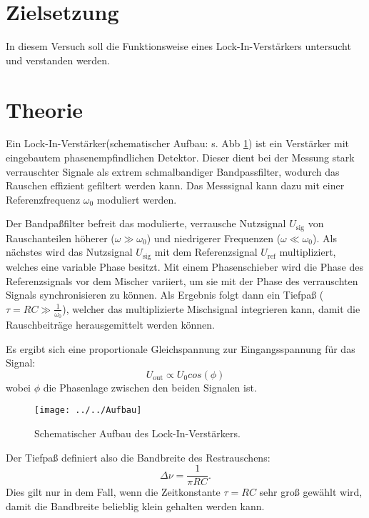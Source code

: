 \section{Zielsetzung}
\label{sec:Zielsetzung}
In diesem Versuch soll die Funktionsweise eines Lock-In-Verstärkers untersucht und verstanden werden.

\section{Theorie}
\label{sec:Theorie}
Ein Lock-In-Verstärker(schematischer Aufbau: s. Abb \ref{fig:aufbau}) ist ein Verstärker mit eingebautem phasenempfindlichen Detektor. Dieser dient bei der Messung stark verrauschter Signale als extrem schmalbandiger Bandpassfilter, wodurch das Rauschen effizient gefiltert werden kann. Das Messsignal kann dazu mit einer Referenzfrequenz $\omega_{0}$ moduliert werden.

Der Bandpaßfilter befreit das modulierte, verrausche Nutzsignal $U_{\text{sig}}$ von Rauschanteilen höherer ($\omega \gg \omega_{0} $) und niedrigerer Frequenzen ($\omega \ll \omega_{0}$).
Als nächstes wird das Nutzsignal $U_{\text{sig}}$ mit dem Referenzsignal $U_{\text{ref}}$ multipliziert, welches eine variable Phase besitzt.
Mit einem Phasenschieber wird die Phase des Referenzsignals vor dem Mischer variiert, um sie mit der Phase des verrauschten Signals synchronisieren zu können. Als Ergebnis folgt dann ein Tiefpaß ($\tau = RC \gg \frac{1}{\omega_{0}}$), welcher das multiplizierte Mischsignal integrieren kann, damit die Rauschbeiträge herausgemittelt werden können. 

Es ergibt sich eine proportionale Gleichspannung zur Eingangsspannung für das Signal:
\begin{equation}
U_{\text{out}} \propto U_{0}cos(\phi)
\end{equation}
wobei $\phi$ die Phasenlage zwischen den beiden Signalen ist. 

\begin{figure}[h!]
	\centering
	\texttt{[image: ../../Aufbau]}
	\caption{Schematischer Aufbau des Lock-In-Verstärkers.}
	\label{fig:aufbau}
\end{figure}

Der Tiefpaß definiert also die Bandbreite des Restrauschens:
\begin{equation*}
\Delta \nu = \frac{1}{\pi RC}.
\end{equation*}
Dies gilt nur in dem Fall, wenn die Zeitkonstante $\tau = RC$ sehr groß gewählt wird, damit die Bandbreite belieblig klein gehalten werden kann. 

